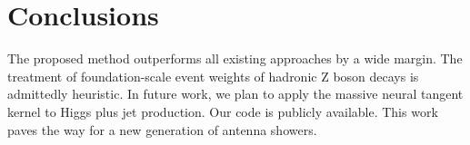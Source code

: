 \section{Conclusions}\label{sec:conclusions}

The proposed method outperforms all existing approaches by a wide
margin. The treatment of foundation-scale event weights of hadronic Z
boson decays is admittedly heuristic. In future work, we plan to apply
the massive neural tangent kernel to Higgs plus jet production. Our code
is publicly available. This work paves the way for a new generation of
antenna showers.

